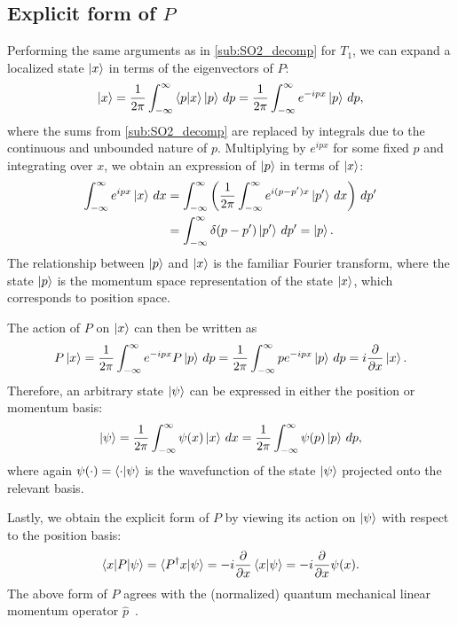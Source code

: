 \subsection{Explicit form of $P$}\label{sub:explicit_P}

Performing the same arguments as in \cref{sub:SO2_decomp} for $T_1$, we can expand a localized state $\ket{x}$  in terms of the eigenvectors of $P$:
\begin{align*}
    \ket{x} = \frac{1}{2\pi}\int_{-\infty}^{\infty} \braket{p|x}\ket{p} \,dp = \frac{1}{2\pi}\int_{-\infty}^{\infty} e^{-ipx}\ket{p} \,dp,
\end{align*}
where the sums from \cref{sub:SO2_decomp} are replaced by integrals due to the continuous and unbounded nature of $p$. Multiplying by $e^{ipx}$ for some fixed $p$ and integrating over $x$, we obtain an expression of $\ket{p}$ in terms of $\ket{x}$:
\begin{align*}
    \int_{-\infty}^{\infty} e^{ipx}\ket{x} \,dx
        &= \int_{-\infty}^{\infty} \left(\frac{1}{2\pi} \int_{-\infty}^{\infty} e^{i(p-p')x}\ket{p'} \,dx \right)\,dp' \\
        &= \int_{-\infty}^{\infty} \delta(p-p') \ket{p'} \,dp' = \ket{p}.
\end{align*}
The relationship between $\ket{p}$ and $\ket{x}$ is the familiar Fourier transform, where the state $\ket{p}$ is the momentum space representation of the state $\ket{x}$, which corresponds to position space.

The action of $P$ on $\ket{x}$ can then be written as
\begin{align*}
    P\ket{x} = \frac{1}{2\pi}\int_{-\infty}^{\infty} e^{-ipx}P\ket{p} \,dp = \frac{1}{2\pi}\int_{-\infty}^{\infty} p e^{-ipx}\ket{p} \,dp = i\frac{\partial}{\partial x}\ket{x}.
\end{align*}
Therefore, an arbitrary state $\ket{\psi}$ can be expressed in either the position or momentum basis:
\begin{align*}
    \ket{\psi} = \frac{1}{2\pi}\int_{-\infty}^{\infty} \psi(x)\ket{x} \,dx = \frac{1}{2\pi}\int_{-\infty}^{\infty} \psi(p)\ket{p} \,dp,
\end{align*}
where again $\psi(\cdot) = \braket{\cdot|\psi}$ is the wavefunction of the state $\ket{\psi}$ projected onto the relevant basis.

Lastly, we obtain the explicit form of $P$ by viewing its action on $\ket{\psi}$ with respect to the position basis:
\begin{align*}
    \braket{x|P|\psi} = \braket{P^\dagger x|\psi} = -i\frac{\partial}{\partial x}\braket{x|\psi} = -i\frac{\partial}{\partial x}\psi(x).
\end{align*}
The above form of $P$ agrees with the (normalized) quantum mechanical linear momentum operator $\hat{p}$~\cite{Hall2013,Griffiths2018}.

